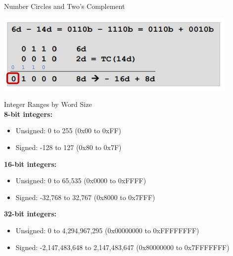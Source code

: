 \begin{concept}{Number Circles and Two's Complement}
\begin{minipage}[t]{0.55\linewidth}
\includegraphics[width=\linewidth]{images/subborrow.png}
\end{minipage}
\end{concept}

\begin{example2}{Integer Ranges by Word Size}\\
\textbf{8-bit integers:}
\begin{itemize}
  \item Unsigned: 0 to 255 (0x00 to 0xFF)
  \item Signed: -128 to 127 (0x80 to 0x7F)
\end{itemize}

\textbf{16-bit integers:}
\begin{itemize}
  \item Unsigned: 0 to 65,535 (0x0000 to 0xFFFF)
  \item Signed: -32,768 to 32,767 (0x8000 to 0x7FFF)
\end{itemize}

\textbf{32-bit integers:}
\begin{itemize}
  \item Unsigned: 0 to 4,294,967,295 (0x00000000 to 0xFFFFFFFF)
  \item Signed: -2,147,483,648 to 2,147,483,647 (0x80000000 to 0x7FFFFFFF)
\end{itemize}
\end{example2}

